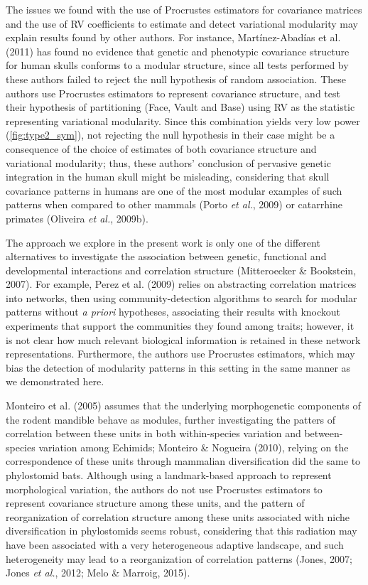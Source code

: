 \documentclass[12pt,twoside]{report}
\begin{document}
The issues we found with the use of Procrustes estimators for covariance
matrices and the use of RV coefficients to estimate and detect
variational modularity may explain results found by other authors. For
instance, Martínez-Abadías et al. (2011) has found no evidence that
genetic and phenotypic covariance structure for human skulls conforms to
a modular structure, since all tests performed by these authors failed
to reject the null hypothesis of random association. These authors use
Procrustes estimators to represent covariance structure, and test their
hypothesis of partitioning (Face, Vault and Base) using RV as the
statistic representing variational modularity. Since this combination
yields very low power (\autoref{fig:type2_sym}), not rejecting the null
hypothesis in their case might be a consequence of the choice of
estimates of both covariance structure and variational modularity; thus,
these authors' conclusion of pervasive genetic integration in the human
skull might be misleading, considering that skull covariance patterns in
humans are one of the most modular examples of such patterns when
compared to other mammals (Porto \emph{et al.}, 2009) or catarrhine
primates (Oliveira \emph{et al.}, 2009b).

The approach we explore in the present work is only one of the different
alternatives to investigate the association between genetic, functional
and developmental interactions and correlation structure (Mitteroecker
\& Bookstein, 2007). For example, Perez et al. (2009) relies on
abstracting correlation matrices into networks, then using
community-detection algorithms to search for modular patterns without
\emph{a priori} hypotheses, associating their results with knockout
experiments that support the communities they found among traits;
however, it is not clear how much relevant biological information is
retained in these network representations. Furthermore, the authors use
Procrustes estimators, which may bias the detection of modularity
patterns in this setting in the same manner as we demonstrated here.

Monteiro et al. (2005) assumes that the underlying morphogenetic
components of the rodent mandible behave as modules, further
investigating the patters of correlation between these units in both
within-species variation and between-species variation among Echimids;
Monteiro \& Nogueira (2010), relying on the correspondence of these
units through mammalian diversification did the same to phylostomid
bats. Although using a landmark-based approach to represent
morphological variation, the authors do not use Procrustes estimators to
represent covariance structure among these units, and the pattern of
reorganization of correlation structure among these units associated
with niche diversification in phylostomids seems robust, considering
that this radiation may have been associated with a very heterogeneous
adaptive landscape, and such heterogeneity may lead to a reorganization
of correlation patterns (Jones, 2007; Jones \emph{et al.}, 2012; Melo \&
Marroig, 2015).
\end{document}
